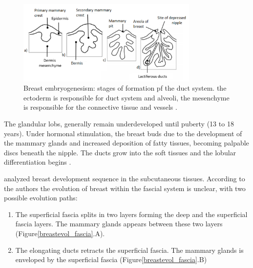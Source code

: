  \begin{figure}[!h]
 \centering
\includegraphics[width=0.8\textwidth,keepaspectratio]{figures/breast_evolution_my.png} 
\caption[Breast embryogenesis: embryonic evolution of duct system. The epidermis is responsible for the creation of ductal system and alveoli, the dermis mesenchyme is responsible for the creation of connective tissue and vessels] {Breast embryogenesism: stages of formation pf the duct system. the ectoderm is responsible for duct system and alveoli, the mesenchyme is responsible for the connective tissue and vessels \citep{skandalakis_embryology_2009}.}
\label{breastembryogenesis}
\end{figure}


The glandular lobs, generally remain underdeveloped until puberty (13 to 18 years). Under hormonal stimulation, the breast buds due to the development of the mammary glands and increased deposition of fatty tissues, becoming palpable discs beneath the nipple. The ducts grow into the soft tissues and the lobular differentiation begins \citep{kopans2007breast}. 

\cite{kopans2007breast} analyzed breast development sequence in the subcutaneous tissues. According to the authors the evolution of breast within the fascial system is unclear, with two possible evolution paths: 
\begin{enumerate}[label=(\Alph*)]
\item The superficial fascia splits in two layers forming the deep and the superficial fascia layers. The mammary glands appears between these two layers (Figure\ref{breastevol_fascia}.A).
\item The elongating ducts retracts the superficial fascia.  The mammary glands is enveloped by the superficial fascia (Figure\ref{breastevol_fascia}.B)
\end{enumerate}

